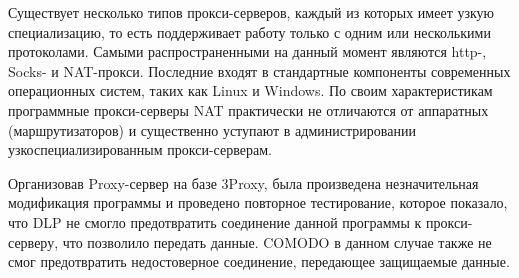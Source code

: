 Существует несколько типов прокси-серверов, каждый из которых имеет узкую специализацию, то есть поддерживает работу только с одним или несколькими протоколами. Самыми распространенными на данный момент являются http-, Socks- и NAT-прокси. Последние входят в стандартные компоненты современных операционных систем, таких как Linux и Windows. По своим характеристикам программные прокси-серверы NAT практически не отличаются от аппаратных (маршрутизаторов) и существенно уступают в администрировании узкоспециализированным прокси-серверам. 

Организовав Proxy-сервер на базе 3Proxy, была произведена незначительная модификация программы и проведено повторное тестирование, которое показало, что DLP не смогло предотвратить соединение данной программы к прокси-серверу, что позволило передать данные. COMODO в данном случае также не смог предотвратить недостоверное соединение, передающее защищаемые данные.